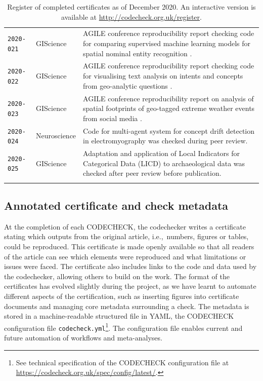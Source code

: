\documentclass[12pt]{article}
\begin{document}
\begin{table}
\begin{tabular}{llp{12cm}}
    \texttt{2020-021}  \cite{cert-2020-021} & GIScience & AGILE conference reproducibility report checking code for comparing supervised machine learning models for spatial nominal entity recognition \cite{Medad2020}. \\ %
    \texttt{2020-022}  \cite{cert-2020-022} & GIScience & AGILE conference reproducibility report checking code for visualising text analysis on intents and concepts from geo-analytic questions \cite{Xu2020}. \\ %
    \texttt{2020-023}  \cite{cert-2020-023} & GIScience & AGILE conference reproducibility report on analysis of spatial footprints of geo-tagged extreme weather events from social media \cite{Owuor2020}. \\
    \texttt{2020-024}  \cite{cert-2020-024} & Neuroscience & Code for multi-agent system for concept drift detection in electromyography \cite{vieira_driftage_2020} was checked during peer review. \\ %
    \texttt{2020-025}  \cite{cert-2020-025} & GIScience & Adaptation and application of Local Indicators for Categorical Data (LICD) to archaeological data \cite{carrer_application_2021} was checked after peer review before publication. \\ %
    \\ \bottomrule
  \end{tabular}
  \caption{Register of completed certificates as of December 2020. An interactive version
  is available at \url{http://codecheck.org.uk/register}.
  }
  \label{tab:register}
\end{table}

\subsection*{Annotated certificate and check metadata}\label{annotated-certificate}

At the completion of each CODECHECK, the codechecker writes a certificate stating which outputs from the original article, i.e.,~numbers, figures or tables, could be reproduced.
This certificate is made openly
available so that all readers of the article can see which elements
were reproduced and what limitations or issues were faced.
The certificate also includes links to the code
and data used by the codechecker, allowing others to build on the
work.
The format of the certificates has evolved slightly during the
project, as we have learnt to automate different aspects of the
certification, such as inserting figures into certificate documents
and managing core metadata surrounding a check.
The metadata is stored in a machine-readable structured file in YAML,
the CODECHECK configuration file \texttt{codecheck.yml}\footnote{
See technical specification of the CODECHECK configuration file at
\url{https://codecheck.org.uk/spec/config/latest/}.}.
The configuration file enables current and future automation of workflows and
meta-analyses.
\end{document}
